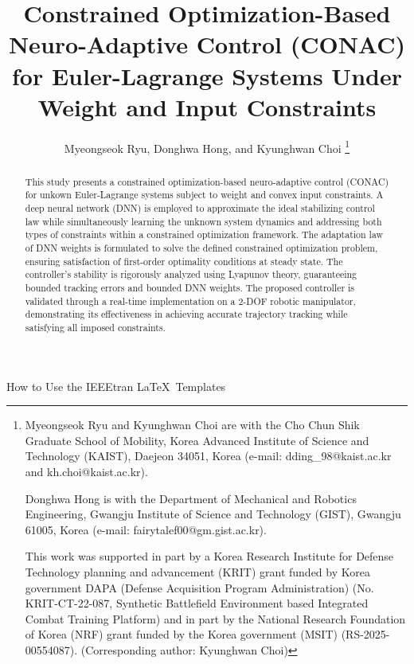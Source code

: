 \documentclass[journal]{IEEEtran}
\begin{document}
\title{
    Constrained Optimization-Based Neuro-Adaptive Control (CONAC) for Euler-Lagrange Systems Under Weight and Input Constraints
} %

\author{
  Myeongseok Ryu, Donghwa Hong, and Kyunghwan Choi
\thanks{
    Myeongseok Ryu and Kyunghwan Choi are with the Cho Chun Shik Graduate School of Mobility, Korea Advanced Institute of Science and Technology (KAIST), Daejeon 34051, Korea (e-mail: dding\_98@kaist.ac.kr and kh.choi@kaist.ac.kr).

    Donghwa Hong is with the Department of Mechanical and Robotics Engineering, Gwangju Institute of Science and Technology (GIST), Gwangju 61005, Korea (e-mail: fairytalef00@gm.gist.ac.kr).

    This work was supported in part by a Korea Research Institute for Defense Technology planning and advancement (KRIT) grant funded by Korea government DAPA (Defense Acquisition Program Administration) (No. KRIT-CT-22-087, Synthetic Battlefield Environment based Integrated Combat Training Platform) and in part by the National Research Foundation of Korea (NRF) grant funded by the Korea government (MSIT) (RS-2025- 00554087). (Corresponding author: Kyunghwan Choi)
    }}

%
{How to Use the IEEEtran \LaTeX \ Templates}

\maketitle

\begin{abstract}
  This study presents a constrained optimization-based neuro-adaptive control (CONAC) for \color{red}unkown\color{black} Euler-Lagrange systems subject to weight and convex input constraints. 
  A deep neural network (DNN) is employed to approximate the ideal stabilizing control law while simultaneously learning the unknown system dynamics and addressing both types of constraints within a constrained optimization framework.
  The adaptation law of DNN weights is formulated to solve the defined constrained optimization problem, ensuring satisfaction of first-order optimality conditions at steady state.
  The controller's stability is rigorously analyzed using Lyapunov theory, guaranteeing bounded tracking errors and bounded DNN weights. 
  The proposed controller is validated through a real-time implementation on a 2-DOF robotic manipulator, demonstrating its effectiveness in achieving accurate trajectory tracking while satisfying all imposed constraints.
\end{abstract}
\end{document}
